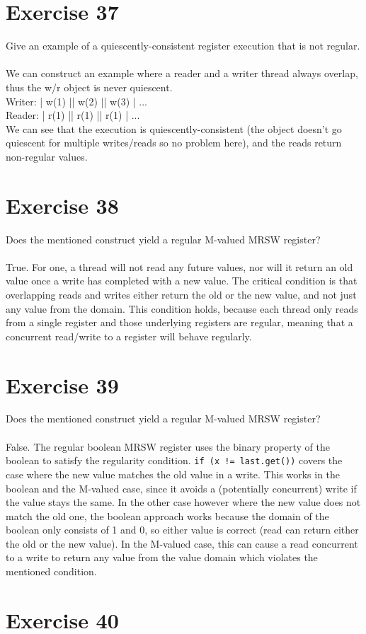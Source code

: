\documentclass[a4paper,%
11pt,%
DIV=14,
headsepline,%
headings=normal,
]{scrartcl}
\newcommand{\exercise}[1]{\section*{Exercise #1}}
\begin{document}
\exercise{37}

Give an example of a quiescently-consistent register execution that is not regular.\\
\\
We can construct an example where a reader and a writer thread always overlap, thus the w/r object is never quiescent.\\
Writer: | w(1) |\space| w(2) |\space| w(3) | ...\\
Reader: \space\space\space\space | r(1) |\space\space| r(1) |\space\space| r(1) | ...\\
We can see that the execution is quiescently-consistent (the object doesn't go quiescent for multiple writes/reads so no problem here), and the reads return non-regular values.

\exercise{38}

Does the mentioned construct yield a regular M-valued MRSW register?\\
\\
True. For one, a thread will not read any future values, nor will it return an old value once a write has completed with a new value. The critical condition is that overlapping reads and writes either return the old or the new value, and not just any value from the domain. This condition holds, because each thread only reads from a single register and those underlying registers are regular, meaning that a concurrent read/write to a register will behave regularly.

\exercise{39}

Does the mentioned construct yield a regular M-valued MRSW register?\\
\\
False. The regular boolean MRSW register uses the binary property of the boolean to satisfy the regularity condition. \texttt{if (x != last.get())} covers the case where the new value matches the old value in a write. This works in the boolean and the M-valued case, since it avoids a (potentially concurrent) write if the value stays the same. In the other case however where the new value does not match the old one, the boolean approach works because the domain of the boolean only consists of 1 and 0, so either value is correct (read can return either the old or the new value). In the M-valued case, this can cause a read concurrent to a write to return any value from the value domain which violates the mentioned condition.

\exercise{40}
\end{document}
